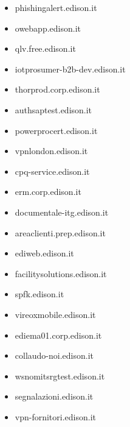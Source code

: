 \documentclass{article}
\begin{document}
\begin{itemize}
            \item phishingalert.edison.it
        
            \item owebapp.edison.it
        
            \item qlv.free.edison.it
        
            \item iotprosumer-b2b-dev.edison.it
        
            \item thorprod.corp.edison.it
        
            \item authsaptest.edison.it
        
            \item powerprocert.edison.it
        
            \item vpnlondon.edison.it
        
            \item cpq-service.edison.it
        
            \item erm.corp.edison.it
        
            \item documentale-itg.edison.it
        
            \item areaclienti.prep.edison.it
        
            \item ediweb.edison.it
        
            \item facilitysolutions.edison.it
        
            \item spfk.edison.it
        
            \item vireoxmobile.edison.it
        
            \item ediema01.corp.edison.it
        
            \item collaudo-noi.edison.it
        
            \item wsnomitsrgtest.edison.it
        
            \item segnalazioni.edison.it
        
            \item vpn-fornitori.edison.it
        

\end{itemize}
\end{document}
